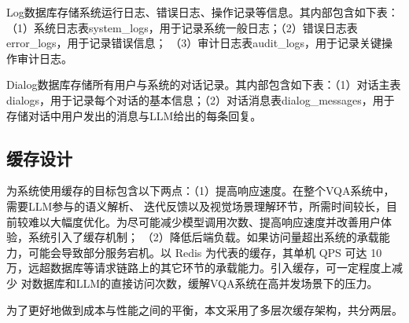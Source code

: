 \begin{table}[h]
    \centering
    \renewcommand{\arraystretch}{1.3} %
    \caption{rule\_condition表字段设置及说明}
    \label{tab:rule_conditions}
\end{table}

Log数据库存储系统运行日志、错误日志、操作记录等信息。其内部包含如下表：（1）系统日志表system\_logs，用于记录系统一般日志；（2）错误日志表error\_logs，用于记录错误信息；
（3）审计日志表audit\_logs，用于记录关键操作审计日志。

Dialog数据库存储所有用户与系统的对话记录。其内部包含如下表：（1）对话主表dialogs，用于记录每个对话的基本信息；（2）对话消息表dialog\_messages，用于
存储对话中用户发出的消息与LLM给出的每条回复。

\subsection{缓存设计}
为系统使用缓存的目标包含以下两点：（1）提高响应速度。在整个VQA系统中，需要LLM参与的语义解析、
迭代反馈以及视觉场景理解环节，所需时间较长，目前较难以大幅度优化。为尽可能减少模型调用次数、提高响应速度并改善用户体验，系统引入了缓存机制；
（2）降低后端负载。如果访问量超出系统的承载能力，可能会导致部分服务宕机。以 Redis 为代表的缓存，其单机 QPS 可达 10 万，远超数据库等请求链路上的其它环节的承载能力。引入缓存，可一定程度上减少
对数据库和LLM的直接访问次数，缓解VQA系统在高并发场景下的压力。

为了更好地做到成本与性能之间的平衡，本文采用了多层次缓存架构，共分两层。

